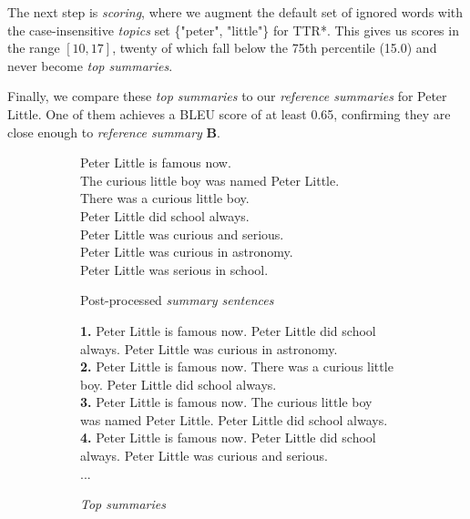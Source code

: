 The next step is \textit{scoring}, where we augment the default set of ignored words with the case-insensitive \textit{topics} set \{"peter", "little"\} for \textsc{TTR*}. This gives us scores in the range $[10,17]$, twenty of which fall below the 75th percentile (15.0) and never become \textit{top summaries}.

Finally, we compare these \textit{top summaries} to our \textit{reference summaries} for Peter Little. One of them achieves a BLEU score of at least 0.65, confirming they are close enough to \textit{reference summary} \textbf{B}.

\begin{figure}[H]
\begin{subfigure}{\textwidth}
\begin{displayquote}
Peter Little is famous now.\\
The curious little boy was named Peter Little.\\
There was a curious little boy.\\
Peter Little did school always.\\
Peter Little was curious and serious.\\
Peter Little was curious in astronomy.\\
Peter Little was serious in school.
\end{displayquote}
\caption{Post-processed \textit{summary sentences}}
\end{subfigure}
\begin{subfigure}{\textwidth}
\vspace{\baselineskip}
\begin{displayquote}
\textbf{1.} Peter Little is famous now. Peter Little did school always. Peter Little was curious in astronomy.\\
\textbf{2.} Peter Little is famous now. There was a curious little boy. Peter Little did school always.\\
\textbf{3.} Peter Little is famous now. The curious little boy was named Peter Little. Peter Little did school always.\\
\textbf{4.} Peter Little is famous now. Peter Little did school always. Peter Little was curious and serious.\\
...
\end{displayquote}
\caption{\textit{Top summaries}}
\label{fig:top_score_summaries_example}
\end{subfigure}
\begin{subfigure}{\textwidth}
\vspace{\baselineskip}

\end{subfigure}
\end{figure}
